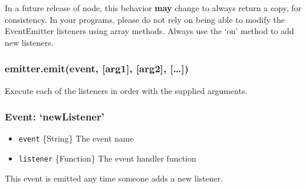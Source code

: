 In a future release of node, this behavior \textbf{may} change to always
return a copy, for consistency. In your programs, please do not rely on
being able to modify the EventEmitter listeners using array methods.
Always use the `on' method to add new listeners.

\subsubsection{emitter.emit(event, {[}arg1{]}, {[}arg2{]},
{[}\ldots{}{]})}

Execute each of the listeners in order with the supplied arguments.

\subsubsection{Event: `newListener'}

\begin{itemize}
\item
  \texttt{event} \{String\} The event name
\item
  \texttt{listener} \{Function\} The event handler function
\end{itemize}

This event is emitted any time someone adds a new listener.
